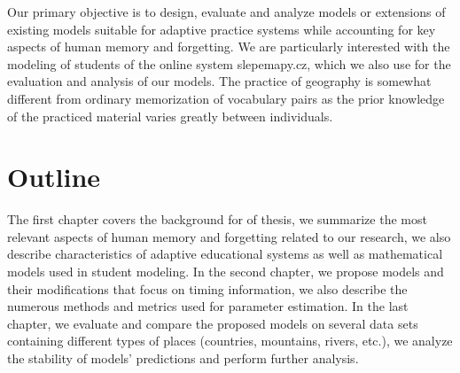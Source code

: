 Our primary objective is to design, evaluate and analyze models or extensions of existing models suitable for adaptive practice systems while accounting for key aspects of human memory and forgetting. We are particularly interested with the modeling of students of the online system slepemapy.cz, which we also use for the evaluation and analysis of our models. The practice of geography is somewhat different from ordinary memorization of vocabulary pairs as the prior knowledge of the practiced material varies greatly between individuals.

\section{Outline}

The first chapter covers the background for of thesis, we summarize the most relevant aspects of human memory and forgetting related to our research, we also describe characteristics of adaptive educational systems as well as mathematical models used in student modeling. In the second chapter, we propose models and their modifications that focus on timing information, we also describe the numerous methods and metrics used for parameter estimation. In the last chapter, we evaluate and compare the proposed models on several data sets containing different types of places (countries, mountains, rivers, etc.), we analyze the stability of models' predictions and perform further analysis.
